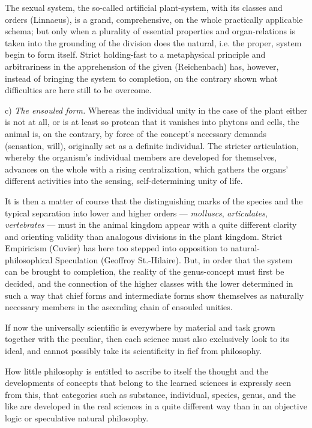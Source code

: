 \documentclass[12pt]{book}
\begin{document}
The sexual system, the so-called artificial plant-system, with its classes and orders (Linnaeus), is a grand,
comprehensive, on the whole practically applicable schema; but only when a plurality of essential properties
and organ-relations is taken into the grounding of the division does the natural, i.e. the proper, system begin
to form itself. Strict holding-fast to a metaphysical principle and arbitrariness in the apprehension of the
given (Reichenbach) has, however, instead of bringing the system to completion, on the contrary shown what
difficulties are here still to be overcome.

c) \emph{The ensouled form.} Whereas the individual unity in the case of the plant either is not at all, or is
at least so protean that it vanishes into phytons and cells, the animal is, on the contrary, by force of the
concept's necessary demands (sensation, will), originally set as a definite individual. The stricter
articulation, whereby the organism's individual members are developed for themselves, advances on the whole
with a rising centralization, which gathers the organs'
different activities into the sensing, self-determining unity of life.

It is then a matter of course that the distinguishing marks of the species and the typical separation into
lower and higher orders — \emph{molluscs}, \emph{articulates}, \emph{vertebrates} — must in the animal kingdom
appear with a quite different clarity and orienting validity than analogous divisions in the plant kingdom.
Strict Empiricism (Cuvier) has here too stepped into opposition to natural-philosophical Speculation (Geoffroy
St.-Hilaire). But, in order that the system can be brought to completion, the reality of the genus-concept must
first be decided, and the connection of the higher classes with the lower determined in such a way that chief
forms and intermediate forms show themselves as naturally necessary members in the ascending chain of ensouled
unities.

If now the universally scientific is everywhere by material and task grown together with the peculiar, then each
science must also exclusively look to its ideal, and cannot possibly take its scientificity in fief from
philosophy.

How little philosophy is entitled to ascribe to itself the thought and the developments of concepts that belong
to the learned sciences is expressly seen from this, that categories such as substance, individual, species,
genus, and the like are developed in the real sciences in a quite different way than in an objective logic or
speculative natural philosophy.
\end{document}
